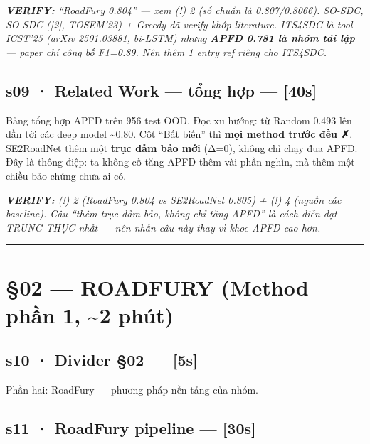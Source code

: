\documentclass[
  11pt,
]{article}
\renewenvironment{quote}
  {\par\smallskip\noindent
   \def\FrameCommand{{\color{deckorange}\vrule width 2.5pt}\hspace{10pt}}%
   \MakeFramed{\advance\hsize-\width\FrameRestore}%
   \footnotesize\itshape\color{deckslate}}
  {\par\endMakeFramed\smallskip}
\begin{document}
\begin{quote}
\textbf{VERIFY:} ``RoadFury 0.804'' --- xem (!) 2 (số chuẩn là
0.807/0.8066). SO-SDC, SO-SDC ({[}2{]}, TOSEM'23) + Greedy đã verify
khớp literature. ITS4SDC là tool ICST'25 (arXiv 2501.03881, bi-LSTM)
nhưng \textbf{APFD 0.781 là nhóm tái lập} --- paper chỉ công bố F1=0.89.
Nên thêm 1 entry ref riêng cho ITS4SDC.
\end{quote}

\subsection{s09 · Related Work --- tổng hợp ---
{[}40s{]}}\label{s09-related-work-tux1ed5ng-hux1ee3p-40s}

Bảng tổng hợp APFD trên 956 test OOD. Đọc xu hướng: từ Random 0.493 lên
dần tới các deep model \textasciitilde0.80. Cột ``Bất biến'' thì
\textbf{mọi method trước đều ✗}. SE2RoadNet thêm một \textbf{trục đảm
bảo mới} (Δ=0), không chỉ chạy đua APFD. Đây là thông điệp: ta không cố
tăng APFD thêm vài phần nghìn, mà thêm một chiều bảo chứng chưa ai có.

\begin{quote}
\textbf{VERIFY:} (!) 2 (RoadFury 0.804 vs SE2RoadNet 0.805) + (!) 4
(nguồn các baseline). Câu ``thêm trục đảm bảo, không chỉ tăng APFD'' là
cách diễn đạt TRUNG THỰC nhất --- nên nhấn câu này thay vì khoe APFD cao
hơn.
\end{quote}

\begin{center}\rule{0.5\linewidth}{0.5pt}\end{center}

\section{§02 --- ROADFURY (Method phần 1, \textasciitilde2
phút)}\label{roadfury-method-phux1ea7n-1-2-phuxfat}

\subsection{s10 · Divider §02 --- {[}5s{]}}\label{s10-divider-02-5s}

Phần hai: RoadFury --- phương pháp nền tảng của nhóm.

\subsection{s11 · RoadFury pipeline ---
{[}30s{]}}\label{s11-roadfury-pipeline-30s}
\end{document}
